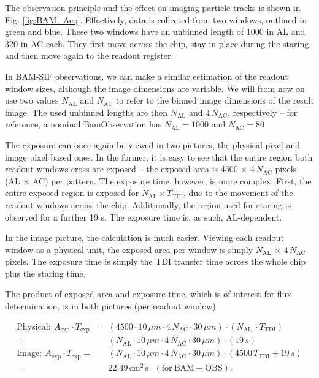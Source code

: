 \documentclass[a4paper, 11pt]{article}
\begin{document}
The observation principle and the effect on imaging particle tracks is shown in Fig. \ref{fig:BAM_Acq}. Effectively, data is collected from two windows, outlined in green and blue. These two windows have an unbinned length of 1000 in AL and 320 in AC each. They first move across the chip, stay in place during the staring, and then move again to the readout register.

In BAM-SIF observations, we can make a similar estimation of the readout window sizes, although the image dimensions are variable. We will from now on use two values $N_\mathrm{AL}$ and $N_\mathrm{AC}$ to refer to the binned image dimensions of the result image. The used unbinned lengths are then $N_\mathrm{AL}$ and $4\, N_\mathrm{AC}$, respectively -- for reference, a nominal BamObservation has $N_\mathrm{AL} = 1000$ and $N_\mathrm{AC} = 80$

The exposure can once again be viewed in two pictures, the physical pixel and image pixel based ones. In the former, it is easy to see that the entire region both readout windows cross are exposed -- the exposed area is 4500 $\times$ $4\, N_\mathrm{AC}$ pixels (AL $\times$ AC) per pattern. The exposure time, however, is more complex: First, the entire exposed region is exposed for $N_\mathrm{AL} \times T_\mathrm{TDI}$, due to the movement of the readout windows across the chip. Additionally, the region used for staring is observed for a further 19 s. The exposure time is, as such, AL-dependent.

In the image picture, the calculation is much easier. Viewing each readout window as a physical unit, the exposed area per window is simply $N_\mathrm{AL}$ $\times$ $4\, N_\mathrm{AC}$ pixels. The exposure time is simply the TDI transfer time across the whole chip plus the staring time.

The product of exposed area and exposure time, which is of interest for flux determination, is in both pictures (per readout window)

\begin{align}
  \mathrm{Physical: }~ A_\mathrm{exp} \cdot T_\mathrm{exp} = &\left(4500 \cdot 10\,\mu m \cdot 4\, N_\mathrm{AC} \cdot 30\,\mu m \right) \cdot \left( N_\mathrm{AL}\ \cdot T_\mathrm{TDI} \right) \\+ &\left( N_\mathrm{AL} \cdot 10\,\mu m \cdot 4\, N_\mathrm{AC} \cdot 30\,\mu m\right) \cdot \left( 19\,s \right)\\
  \mathrm{Image: }~ A_\mathrm{exp} \cdot T_\mathrm{exp} = &\left( N_\mathrm{AL} \cdot 10\,\mu m \cdot 4\, N_\mathrm{AC} \cdot 30\,\mu m\right) \cdot \left(4500\, T_\mathrm{TDI} + 19\,s \right)\\
  = &22.49\,\mathrm{cm^{2}\,s} ~~~\mathrm{(for~BAM\!\!-\!\!OBS)}.
\end{align}
\end{document}
